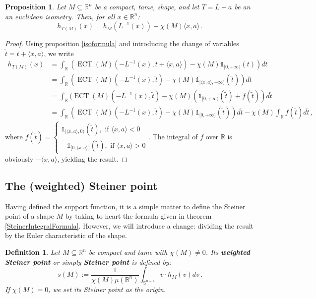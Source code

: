\documentclass[a4paper]{article}
\newtheorem{prop}[theorem]{Proposition}
\newtheorem{definition}[theorem]{Definition}
\newcommand{\ECT}{\operatorname{ECT}}
\newcommand{\bb}{\mathbb}
\newcommand{\la}{\langle}
\newcommand{\ra}{\rangle}
\begin{document}
\begin{prop}
	\label{IsoSupport}
	Let $M\subseteq \bb R^n$ be a compact, tame, shape, and let $T=L+a$ be an an euclidean isometry. Then, for all $x \in \bb R^n$:
	\[ h_{T(M)}(x)=h_M(L^{-1}(x))+\chi(M) \la x, a \ra \, . \]
\end{prop}

\begin{proof}
	Using proposition \ref{isoformula} and introducing the change of variables $\tilde t = t+\la x,a \ra$, we write
	\begin{align*} h_{T(M)}(x) &= \int_{\bb R} (\ECT(M)(-L^{-1}(x), t+\la x,a \ra)-\chi(M)\bb 1_{[0, +\infty)}(t)) dt \\
	& = \int_{\bb R} (\ECT(M)(-L^{-1}(x), \tilde t)-\chi(M)\bb 1_{[\la x,a \ra, +\infty)}(\tilde t)) d\tilde t \\
	& = \int_{\bb R} (\ECT(M)(-L^{-1}(x), \tilde t)-\chi(M)(\bb 1_{[0, +\infty)}(\tilde t)+f(\tilde t)) d\tilde t\\
	& = \int_{\bb R} (\ECT(M)(-L^{-1}(x), \tilde t)-\chi(M)\bb 1_{[0, +\infty)}(\tilde t)) d \tilde t-\chi(M)\int_{\bb R}f(\tilde t) d\tilde t \, , \end{align*}
	where $f(\tilde t)= \begin{cases}
		\bb 1_{[\la x,a \ra, 0)}(\tilde t), \text{ if } \la x,a \ra<0 \\
		-\bb 1_{[0,\la x,a \ra)}(\tilde t), \text{ if } \la x, a\ra >0
	\end{cases}$. The integral of $f$ over $\bb R$ is obviously $-\la x, a\ra$, yielding the result.
\end{proof}

\subsection{The (weighted) Steiner point}
Having defined the support function, it is a simple matter to define the Steiner point of a shape $M$ by taking to heart the formula given in theorem \ref{SteinerIntegralFormula}. However, we will introduce a change: dividing the result by the Euler characteristic of the shape.

\begin{definition}
	Let $M\subseteq \bb R^n$ be compact and tame with $\chi(M) \neq 0$. Its \textbf{weighted Steiner point} or simply \textbf{Steiner point} is defined by:
	\[ s(M):=\frac{1}{\chi(M) \mu(\bb B^{n})} \int_{\bb S^{n-1}} v \cdot h_M(v) dv \, . \]
	If $\chi(M)=0$, we set its Steiner point as the origin. 
\end{definition}
\end{document}

